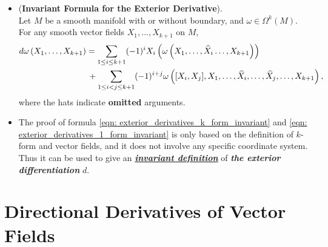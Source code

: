 \documentclass[11pt]{article}
\begin{document}
\begin{itemize}
\item \begin{proposition} (\textbf{Invariant Formula for the Exterior Derivative}).\\
Let $M$ be a smooth manifold with or without boundary, and $\omega \in \Omega^k(M)$. For any smooth vector fields $X_1,\ldots, X_{k+1}$ on $M$,
\begin{align}
d\omega\left(X_1,\ldots, X_{k+1}\right) &= \sum_{1\le i \le k+1}(-1)^{i}X_i\left(\omega\left(X_1,\ldots,  \widehat{X}_i  \ldots, X_{k+1}\right)\right)  \nonumber\\
&\, +   \sum_{1\le i < j \le k+1}(-1)^{i+j}\omega\left([X_i, X_j], X_1,\ldots,  \widehat{X}_i, \ldots,  \widehat{X}_j, \ldots, X_{k+1}\right),
 \label{eqn: exterior_derivatives_k_form_invariant}
\end{align}
where the hats indicate \textbf{omitted} arguments.
\end{proposition}

\item \begin{remark}
The proof of formula \eqref{eqn: exterior_derivatives_k_form_invariant} and \eqref{eqn: exterior_derivatives_1_form_invariant} is only based on the definition of $k$-form and vector fields, and it does not involve any specific coordinate system. Thus it can be used to give an \underline{\emph{\textbf{invariant definition}}} of \emph{\textbf{the exterior differentiation}} $d$.
\end{remark}
\end{itemize}


\section{Directional Derivatives of Vector Fields}
\end{document}

